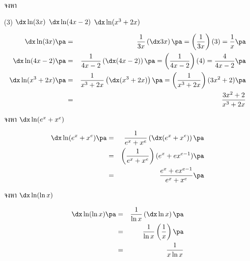 \begin{frame}[t]
\begin{ex}
จงหา
\begin{tasks}(3)
\task $\dx \ln (3x)$
\task $\dx \ln (4x-2)$
\task $\dx \ln(x^3+2x)$
\end{tasks}
\end{ex}
\begin{sol}
\begin{eqnarray*}
\dx \ln (3x) \pa &=& \frac{1}{3x} \left(\dx 3x\right) \pa = \left(\frac{1}{3x} \right)( 3 )= \frac{1}{x} \pa \\
\dx \ln (4x-2) \pa &=& \frac{1}{4x-2} \left(\dx (4x-2)\right) \pa = \left(\frac{1}{4x-2}\right) (4) = \frac{4}{4x-2} \pa \\
\dx \ln (x^3+2x) \pa &=& \frac{1}{x^3+2x} \left(\dx (x^3+2x)\right) \pa = \left(\frac{1}{x^3+2x}\right) (3x^2+2) \pa \\
&=& \frac{3x^2+2}{x^3+2x}
\end{eqnarray*}
\end{sol}
\end{frame}


\begin{frame}[t]
\begin{ex}
จงหา $\dx \ln(e^x + x^e)$
\end{ex}
\begin{sol}
\begin{eqnarray*}
\dx \ln (e^x + x^e) \pa &=& \frac{1}{e^x+x^e} \left( \dx (e^x + x^e) \right) \pa \\
&=& \left( \frac{1}{e^x+x^e} \right) (e^x + ex^{e-1}) \pa \\
&=& \frac{e^x + ex^{e-1}}{e^x + x^e} \pa \\
\end{eqnarray*}
\end{sol}
\end{frame}


\begin{frame}[t]
\begin{ex}
จงหา $\dx \ln (\ln x)$
\end{ex}
\begin{sol}
\begin{eqnarray*}
\dx \ln (\ln x) \pa &=& \frac{1}{\ln x} \left( \dx \ln x\right) \pa \\
&=& \frac{1}{\ln x} \left( \frac{1}{x}\right) \pa \\
&=& \frac{1}{x\ln x}
\end{eqnarray*}
\end{sol}
\end{frame}

